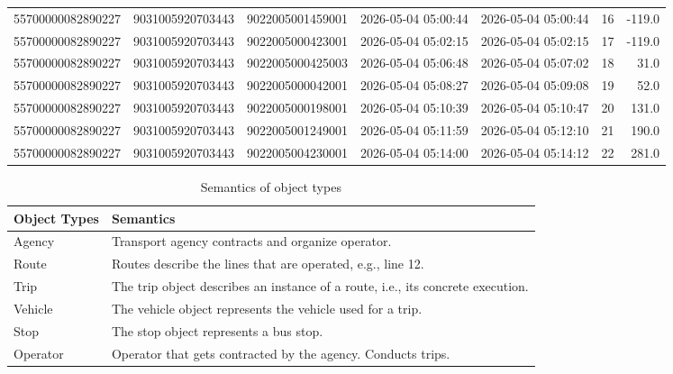 \begin{table}[H]
\begin{tabular}{lllllrr}
\cellcolor{yellow!35}55700000082890227 & \cellcolor{yellow!35}9031005920703443 & 9022005001459001 & 2026-05-04 05:00:44 & 2026-05-04 05:00:44 & 16 & -119.0 \\
\cellcolor{yellow!35}55700000082890227 & \cellcolor{yellow!35}9031005920703443 & 9022005000423001 & 2026-05-04 05:02:15 & 2026-05-04 05:02:15 & 17 & -119.0 \\
\cellcolor{yellow!35}55700000082890227 & \cellcolor{yellow!35}9031005920703443 & 9022005000425003 & 2026-05-04 05:06:48 & 2026-05-04 05:07:02 & 18 & 31.0 \\
\cellcolor{yellow!35}55700000082890227 & \cellcolor{yellow!35}9031005920703443 & 9022005000042001 & 2026-05-04 05:08:27 & 2026-05-04 05:09:08 & 19 & 52.0 \\
\cellcolor{yellow!35}55700000082890227 & \cellcolor{yellow!35}9031005920703443 & 9022005000198001 & 2026-05-04 05:10:39 & 2026-05-04 05:10:47 & 20 & 131.0 \\
\cellcolor{yellow!35}55700000082890227 & \cellcolor{yellow!35}9031005920703443 & 9022005001249001 & 2026-05-04 05:11:59 & 2026-05-04 05:12:10 & 21 & 190.0 \\
\cellcolor{yellow!35}55700000082890227 & \cellcolor{yellow!35}9031005920703443 & 9022005004230001 & 2026-05-04 05:14:00 & 2026-05-04 05:14:12 & 22 & 281.0 \\
\bottomrule
\end{tabular}
\end{table}


\begin{table}[h]
\caption{Semantics of object types}
\centering
\renewcommand{\arraystretch}{1.2}
\begin{tabular}{p{3cm} p{10cm}}
\toprule
\textbf{Object Types} & \textbf{Semantics} \\
\midrule
Agency & Transport agency contracts and organize operator. \\
Route & Routes describe the lines that are operated, e.g., line 12. \\
Trip & The trip object describes an instance of a route, i.e., its concrete execution. \\
Vehicle & The vehicle object represents the vehicle used for a trip. \\
Stop & The stop object represents a bus stop. \\
Operator & Operator that gets contracted by the agency. Conducts trips. \\
\bottomrule
\end{tabular}
\label{tab:objects_semantic}
\end{table}




